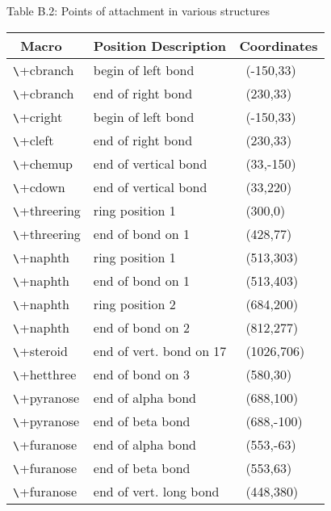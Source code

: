 \vspace{2mm}
 \centerline{Table B.2: Points of attachment in various structures}

 \vspace{3mm}
 \hspace{1.1cm}
 \begin{minipage}{11cm}
 \begin{tabular}{|l|l|l|}
  \hline
  \ Macro             & Position Description      & Coordinates \\
  \hline
  \verb+\+cbranch   & begin of left bond        & \ (-150,33) \\[-2mm]
  \verb+\+cbranch   & end of right bond         & \ (230,33)  \\[-2mm]
  \verb+\+cright    & begin of left bond        & \ (-150,33) \\[-2mm]
  \verb+\+cleft     & end of right bond         & \ (230,33)  \\[-2mm]
  \verb+\+chemup    & end of vertical bond      & \ (33,-150) \\[-2mm]
  \verb+\+cdown     & end of vertical bond      & \ (33,220)  \\[-2mm]
  \verb+\+threering & ring position 1           & \ (300,0)   \\[-2mm]
  \verb+\+threering & end of bond on 1          & \ (428,77)  \\[-2mm]
  \verb+\+naphth    & ring position 1           & \ (513,303) \\[-2mm]
  \verb+\+naphth    & end of bond on 1          & \ (513,403) \\[-2mm]
  \verb+\+naphth    & ring position 2           & \ (684,200) \\[-2mm]
  \verb+\+naphth    & end of bond on 2          & \ (812,277) \\[-2mm]
  \verb+\+steroid   & end of vert. bond on 17   & \ (1026,706)\\[-2mm]
  \verb+\+hetthree  & end of bond on 3          & \ (580,30)  \\[-2mm]
  \verb+\+pyranose  & end of alpha bond         & \ (688,100) \\[-2mm]
  \verb+\+pyranose  & end of beta bond          & \ (688,-100)\\[-2mm]
  \verb+\+furanose  & end of alpha bond         & \ (553,-63) \\[-2mm]
  \verb+\+furanose  & end of beta bond          & \ (553,63)  \\[-2mm]
  \verb+\+furanose  & end of vert. long bond    & \ (448,380) \\[-2mm]

\end{tabular}
\end{minipage}
